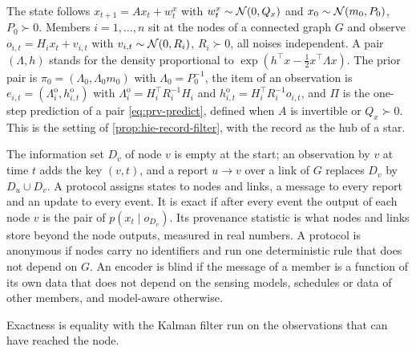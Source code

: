 The state follows $x_{t+1}=Ax_t+w^x_t$ with $w^x_t\sim\mathcal{N}(0,Q_x)$ and $x_0\sim\mathcal{N}(m_0,P_0)$, $P_0\succ0$. Members $i=1,\dots,n$ sit at the nodes of a connected graph $G$ and observe $o_{i,t}=H_ix_t+v_{i,t}$ with $v_{i,t}\sim\mathcal{N}(0,R_i)$, $R_i\succ0$, all noises independent. A pair $(\Lambda,h)$ stands for the density proportional to $\exp(h^\top x-\frac12x^\top\Lambda x)$. The prior pair is $\pi_0=(\Lambda_0,\Lambda_0m_0)$ with $\Lambda_0=P_0^{-1}$, the item of an observation is $e_{i,t}=(\Lambda^{\mathrm o}_i,h^{\mathrm o}_{i,t})$ with $\Lambda^{\mathrm o}_i=H_i^\top R_i^{-1}H_i$ and $h^{\mathrm o}_{i,t}=H_i^\top R_i^{-1}o_{i,t}$, and $\Pi$ is the one-step prediction of a pair \eqref{eq:prv-predict}, defined when $A$ is invertible or $Q_x\succ0$. This is the setting of \cref{prop:hie-record-filter}, with the record as the hub of a star.

\begin{definition}\label{def:prv-protocol}
The information set $D_v$ of node $v$ is empty at the start; an observation by $v$ at time $t$ adds the key $(v,t)$, and a report $u\to v$ over a link of $G$ replaces $D_v$ by $D_u\cup D_v$. A protocol assigns states to nodes and links, a message to every report and an update to every event. It is exact if after every event the output of each node $v$ is the pair of $p(x_t\mid o_{D_v})$. Its provenance statistic is what nodes and links store beyond the node outputs, measured in real numbers. A protocol is anonymous if nodes carry no identifiers and run one deterministic rule that does not depend on $G$. An encoder is blind if the message of a member is a function of its own data that does not depend on the sensing models, schedules or data of other members, and model-aware otherwise.
\end{definition}

Exactness is equality with the Kalman filter \citep{kalman1960new} run on the observations that can have reached the node.

